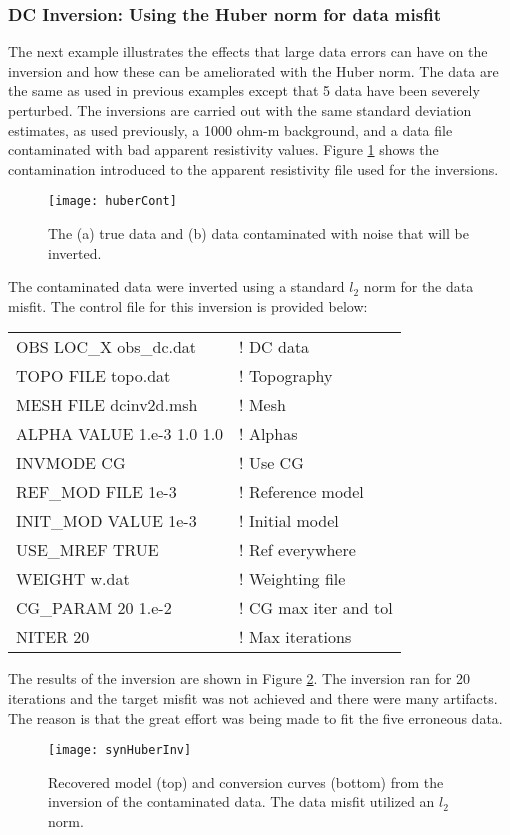 \subsubsection{DC Inversion: Using the Huber norm for data misfit}
The next example illustrates the effects that large data errors can have on the inversion and how these can be ameliorated with the Huber norm. The data are the same as used in previous examples except that 5 data have been severely perturbed. The inversions are carried out with the same standard deviation estimates, as used previously, a 1000 ohm-m background, and a data file contaminated with bad apparent resistivity values. Figure \ref{fig:huberCont} shows the contamination introduced to the apparent resistivity file used for the inversions.
%
\begin{figure}
\centering
\texttt{[image: huberCont]}
\caption{The (a) true data and (b) data contaminated with noise that will be inverted.}
\label{fig:huberCont}
\end{figure}

The contaminated data were inverted using a standard $l_2$ norm for the data misfit. The control file for this inversion is provided below:
%
\begin{fileExample}
\begin{tabular}{|ll|}
\hline
OBS LOC\_X obs\_dc.dat & ! DC data \\
TOPO FILE topo.dat & ! Topography\\
MESH FILE dcinv2d.msh & ! Mesh \\
ALPHA VALUE 1.e-3 1.0 1.0 & ! Alphas \\
INVMODE CG & ! Use CG \\
REF\_MOD FILE 1e-3 & ! Reference model \\
INIT\_MOD VALUE 1e-3 & ! Initial model \\
USE\_MREF TRUE & ! Ref everywhere  \\
WEIGHT w.dat & ! Weighting file \\
CG\_PARAM 20 1.e-2 & ! CG max iter and tol \\
NITER 20 & ! Max iterations \\
\hline
\end{tabular}
\end{fileExample}
%
The results of the inversion are shown in Figure \ref{fig:synHuberInv}. The inversion ran for 20 iterations and the target misfit was not achieved and there were many artifacts. The reason is that the great effort was being made to fit the five erroneous data.
%
\begin{figure}
\centering
\texttt{[image: synHuberInv]}
\caption{Recovered model (top) and conversion curves (bottom) from the inversion of the contaminated data. The data misfit utilized an $l_2$ norm.}
\label{fig:synHuberInv}
\end{figure}

